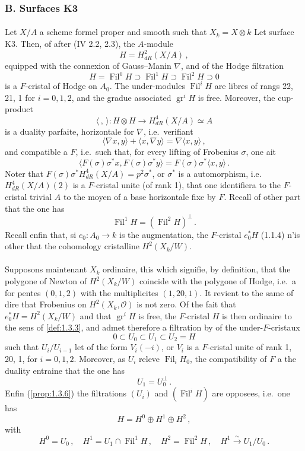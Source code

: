 \documentclass[12pt,a4paper]{article}
\theoremstyle{plain}
\theoremstyle{definition}
\theoremstyle{remark}
\DeclareMathOperator{\gr}{gr}
\DeclareMathOperator{\Fil}{Fil}
\begin{document}
\subsubsection[B. Surfaces K3]{B. Surfaces K3}

\paragraph{}

Let $X/A$ a scheme formel proper and smooth such that $X_k = X \otimes k$ Let surface K3. Then, of after (IV 2.2, 2.3), the $A$-module
\[
H = H_{dR}^2(X/A)\,,
\]
equipped with the connexion of Gauss--Manin $\nabla$, and of the Hodge filtration
\[
H = \Fil^0H \supset \Fil^1H \supset \Fil^2H \supset 0
\]
is a $F$-cristal of Hodge on $A_0$. The under-modules $\Fil^iH$ are libres of rangs 22, 21, 1 for $i = 0, 1, 2$, and the gradue associated $\gr^iH$ is free. Moreover, the cup-product
\[
\langle\,,\,\rangle : H \otimes H \longrightarrow H_{dR}^4(X/A) \simeq A
\]
is a duality parfaite, horizontale for $\nabla$, i.e.\ verifiant
\[
\langle\nabla x, y\rangle + \langle x, \nabla y\rangle = \nabla\langle x, y\rangle\,,
\]
and compatible a $F$, i.e.\ such that, for every lifting of Frobenius $\sigma$, one ait
\[
\langle F(\sigma)\sigma^*x, F(\sigma)\sigma^*y\rangle = F(\sigma)\sigma^*\langle x, y\rangle\,.\]
Noter that $F(\sigma)\sigma^*H_{dR}^4(X/A) = p^2\sigma^*$, or $\sigma^*$ is a automorphism, i.e.\ $H_{dR}^4(X/A)(2)$ is a $F$-cristal unite (of rank 1), that one identifiera to the $F$-cristal trivial $A$ to the moyen of a base horizontale fixe by $F$. Recall of other part that the one has
\[
\Fil^1H = (\Fil^2H)^\perp\,.\]
Recall enfin that, si $e_0 : A_0 \to k$ is the augmentation, the $F$-cristal $e_0^*H$ (1.1.4) n'is other that the cohomology cristalline $H^2(X_k/W)$.

\paragraph{}

Supposons maintenant $X_k$ ordinaire, this which signifie, by definition, that the polygone of Newton of $H^2(X_k/W)$ coincide with the polygone of Hodge, i.e.\ a for pentes $(0, 1, 2)$ with the multiplicites $(1, 20, 1)$. It revient to the same of dire that Frobenius on $H^2(X_k, \mathcal{O})$ is not zero. Of the fait that $e_0^*H = H^2(X_k/W)$ and that $\gr^iH$ is free, the $F$-cristal $H$ is then ordinaire to the sens of \ref{def:1.3.3}, and admet therefore a filtration by of the under-$F$-cristaux
\[
0 \subset U_0 \subset U_1 \subset U_2 = H
\]
such that $U_i/U_{i-1}$ let of the form $V_i(-i)$, or $V_i$ is a $F$-cristal unite of rank 1, 20, 1, for $i = 0, 1, 2$. Moreover, as $U_i$ releve $\Fil_iH_0$, the compatibility of $F$ a the duality entraine that the one has
\[
U_1 = U_0^\perp\,.\]
Enfin (\ref{prop:1.3.6}) the filtrations $(U_i)$ and $(\Fil^iH)$ are opposees, i.e.\ one has
\[
H = H^0 \oplus H^1 \oplus H^2\,,
\]
with
\[
H^0 = U_0\,, \quad H^1 = U_1 \cap \Fil^1H\,, \quad H^2 = \Fil^2H\,, \quad H^1 \xrightarrow{\sim} U_1/U_0\,.\]
\end{document}
